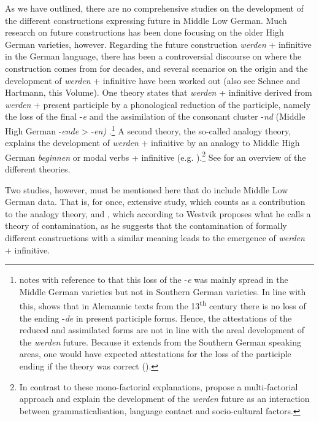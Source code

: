 \documentclass[output=paper,colorlinks,citecolor=brown]{langscibook}
\begin{document}
As we have outlined, there are no comprehensive studies on the development of the different constructions expressing future in Middle Low German. Much research on future constructions has been done focusing on the older High German varieties, however. Regarding the future construction \textit{werden} + infinitive in the German language, there has been a controversial discourse on where the construction comes from for decades, and several scenarios on the origin and the development of \textit{werden} + infinitive have been worked out (also see Schnee and Hartmann, this Volume). One theory states that \textit{werden} + infinitive derived from \textit{werden} + present participle by a phonological reduction of the participle, namely the loss of the final -\textit{e} and the assimilation of the consonant cluster -\textit{nd} (Middle High German -\textit{ende} > -\textit{en)} \citep[397--398, § 373]{weinhold1967}.\footnote{\citet[397, § 373]{weinhold1967} notes with reference to \citet{bech1901} that this loss of the -\textit{e} was mainly spread in the Middle German varieties but not in Southern German varieties. In line with this, \citet[91]{Kleiner1925} shows that in Alemannic texts from the 13\textsuperscript{th} century there is no loss of the ending -\textit{de} in present participle forms. Hence, the attestations of the reduced and assimilated forms are not in line with the areal development of the \textit{werden} future. Because it extends from the Southern German speaking areas, one would have expected attestations for the loss of the participle ending if the theory was correct (\cite[3]{Jäger2024}).} A second theory, the so-called analogy theory, explains the development of \textit{werden} + infinitive by an analogy to Middle High German \textit{beginnen} or modal verbs + infinitive (e.g. \cite[177]{Wilmanns1899}).\footnote{In contrast to these mono-factorial explanations, \citet{DiewaldHabermann2005} propose a multi-factorial approach and explain the development of the \textit{werden} future as an interaction between grammaticalisation, language contact and socio-cultural factors.} See \citet{Westvik2000} for an overview of the different theories.
\largerpage[2]

Two studies, however, must be mentioned here that do include Middle Low German data. That is, for once,  extensive study, which \citet{Westvik2000} counts as a contribution to the analogy theory, and \citet{Schmid2000}, which according to Westvik proposes what he calls a theory of contamination, as he suggests that the contamination of formally different constructions with a similar meaning leads to the emergence of \textit{werden} + infinitive.
\end{document}
